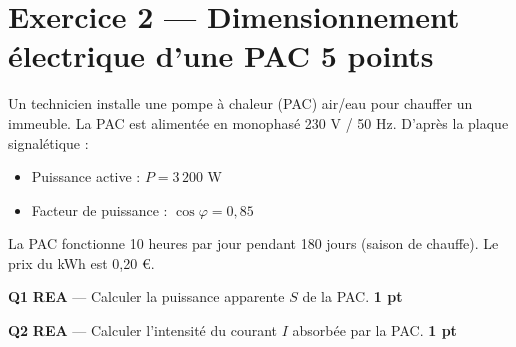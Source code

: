 \documentclass[a4paper,11pt]{article}
\newcommand{\pts}[1]{\hfill\textcolor{gris}{\small\textbf{#1}}}
\newcommand{\comp}[1]{\colorbox{blue!10}{\scriptsize\textbf{#1}}}
\begin{document}
\newpage

\section*{Exercice 2 — Dimensionnement électrique d'une PAC \pts{5 points}}

\begin{contextebox}
Un technicien installe une pompe à chaleur (PAC) air/eau pour chauffer un immeuble. La PAC est alimentée en monophasé 230 V / 50 Hz. D'après la plaque signalétique :
\begin{itemize}[nosep]
  \item Puissance active : $P = 3\,200$ W
  \item Facteur de puissance : $\cos\varphi = 0{,}85$
\end{itemize}
La PAC fonctionne 10 heures par jour pendant 180 jours (saison de chauffe). Le prix du kWh est 0,20 €.
\end{contextebox}

\begin{center}
\end{center}

\textbf{Q1} \comp{REA} — Calculer la puissance apparente $S$ de la PAC. \pts{1 pt}

\begin{reponsebox}[3cm]
\dotfill

\dotfill

\dotfill
\end{reponsebox}

\textbf{Q2} \comp{REA} — Calculer l'intensité du courant $I$ absorbée par la PAC. \pts{1 pt}

\begin{reponsebox}[3cm]
\dotfill

\dotfill

\dotfill
\end{reponsebox}
\end{document}
